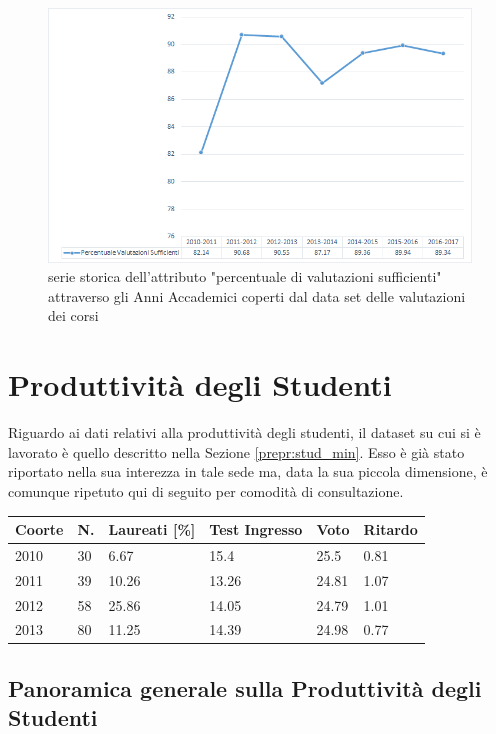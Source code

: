     \begin{figure}
        \centering
        \caption{serie storica dell'attributo "percentuale di valutazioni sufficienti" attraverso gli Anni Accademici coperti dal data set delle valutazioni dei corsi}
        \label{eval_p}
        \includegraphics[scale=0.56]{../visual/eval_2.png}
    \end{figure}

\section{Produttività degli Studenti}

    Riguardo ai dati relativi alla produttività degli studenti, il dataset su cui si è lavorato è quello descritto nella Sezione \ref{prepr:stud_min}. Esso è già stato riportato nella sua interezza in tale sede ma, data la sua piccola dimensione, è comunque ripetuto qui di seguito per comodità di consultazione. \\

    \begin{tabular}{llllll}
		\hline
		Coorte & N. & Laureati {[}\%{]} & Test Ingresso & Voto & Ritardo \\ \hline
		2010 & 30 & 6.67 & 15.4 & 25.5 & 0.81 \\
		2011 & 39 & 10.26 & 13.26 & 24.81 & 1.07 \\
		2012 & 58 & 25.86 & 14.05 & 24.79 & 1.01 \\
		2013 & 80 & 11.25 & 14.39 & 24.98 & 0.77 \\ \hline
	\end{tabular}

    \subsection{Panoramica generale sulla Produttività degli Studenti}

